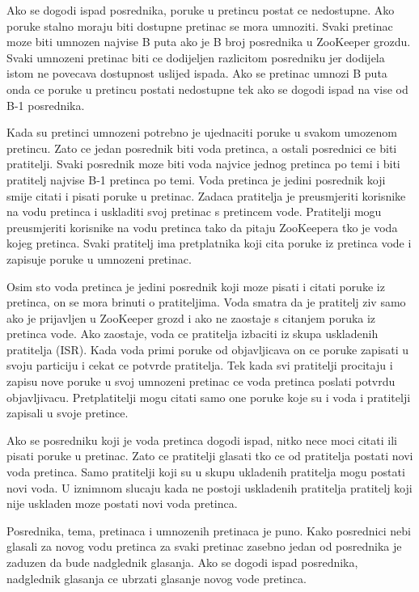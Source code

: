 \documentclass[times, utf8, diplomski, numeric]{fer}
\begin{document}
Ako se dogodi ispad posrednika, poruke u pretincu postat ce nedostupne. Ako poruke stalno moraju biti dostupne pretinac se mora umnoziti. Svaki pretinac moze biti umnozen najvise B puta ako je B broj posrednika u ZooKeeper grozdu. Svaki umnozeni pretinac biti ce dodijeljen razlicitom posredniku jer dodijela istom ne povecava dostupnost uslijed ispada. Ako se pretinac umnozi B puta onda ce poruke u pretincu postati nedostupne tek ako se dogodi ispad na vise od B-1 posrednika.

Kada su pretinci umnozeni potrebno je ujednaciti poruke u svakom umozenom pretincu. Zato ce jedan posrednik biti voda pretinca, a ostali posrednici ce biti pratitelji. Svaki posrednik moze biti voda najvice jednog pretinca po temi i biti pratitelj najvise B-1 pretinca po temi. Voda pretinca je jedini posrednik koji smije citati i pisati poruke u pretinac. Zadaca pratitelja je preusmjeriti korisnike na vodu pretinca i uskladiti svoj pretinac s pretincem vode. Pratitelji mogu preusmjeriti korisnike na vodu pretinca tako da pitaju ZooKeepera tko je voda kojeg pretinca. Svaki pratitelj ima pretplatnika koji cita poruke iz pretinca vode i zapisuje poruke u umnozeni pretinac.

Osim sto voda pretinca je jedini posrednik koji moze pisati i citati poruke iz pretinca, on se mora brinuti o pratiteljima. Voda smatra da je pratitelj ziv samo ako je prijavljen u ZooKeeper grozd i ako ne zaostaje s citanjem poruka iz pretinca vode. Ako zaostaje, voda ce pratitelja izbaciti iz skupa uskladenih pratitelja (ISR). Kada voda primi poruke od objavljicava on ce poruke zapisati u svoju particiju i cekat ce potvrde pratitelja. Tek kada svi pratitelji procitaju i zapisu nove poruke u svoj umnozeni pretinac ce voda pretinca poslati potvrdu objavljivacu. Pretplatitelji mogu citati samo one poruke koje su i voda i pratitelji zapisali u svoje pretince.

Ako se posredniku koji je voda pretinca dogodi ispad, nitko nece moci citati ili pisati poruke u pretinac. Zato ce pratitelji glasati tko ce od pratitelja postati novi voda pretinca. Samo pratitelji koji su u skupu ukladenih pratitelja mogu postati novi voda. U iznimnom slucaju kada ne postoji uskladenih pratitelja pratitelj koji nije uskladen moze postati novi voda pretinca.

Posrednika, tema, pretinaca i umnozenih pretinaca je puno. Kako posrednici nebi glasali za novog vodu pretinca za svaki pretinac zasebno jedan od posrednika je zaduzen da bude nadglednik glasanja. Ako se dogodi ispad posrednika, nadglednik glasanja ce ubrzati glasanje novog vode pretinca.  
\end{document}
